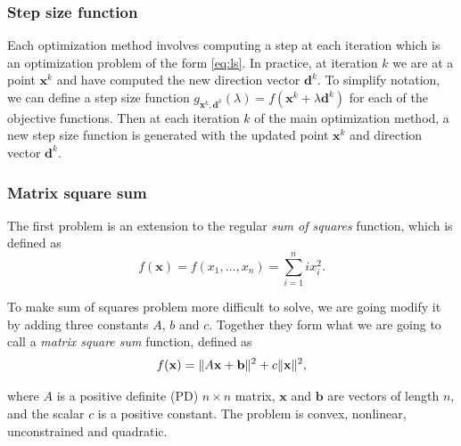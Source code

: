 \documentclass[english, 12pt, a4paper, sci, utf8, a-1b, online, table]{aaltothesis}
\newcommand{\vect}[1]{\ensuremath{\mathbf{#1}}}
\newcommand{\norm}[1]{\ensuremath\Vert #1 \Vert}
\begin{document}
\subsubsection{Step size function}

Each optimization method involves computing a step at each iteration which is an optimization problem of the form \eqref{eq:ls}. In practice, at iteration $k$ we are at a point $\vect{x}^k$ and have computed the new direction vector $\vect{d}^k$. To simplify notation, we can define a step size function $g_{\vect{x}^k, \vect{d}^k}(\lambda) = f(\vect{x}^k + \lambda \vect{d}^k)$ for each of the objective functions. Then at each iteration $k$ of the main optimization method, a new step size function is generated with the updated point $\vect{x}^k$ and direction vector $\vect{d}^k$.

\subsubsection{Matrix square sum}
\label{sect:matrix_square_sum}

The first problem is an extension to the regular \emph{sum of squares} function, which is defined as
\begin{equation}
    f(\mathbf{x})=f(x_1, ..., x_n)=\sum_{i=1}^{n}{ix_i^2}.
\end{equation}

To make sum of squares problem more difficult to solve, we are going modify it by adding three constants $A$, $b$ and $c$. Together they form what we are going to call a \emph{matrix square sum} function, defined as
\begin{equation}
    f(\vect{x}) = \norm{A \vect{x} + \vect{b}} ^ 2 + c \norm{\vect{x}} ^ 2,
\end{equation}

where $A$ is a positive definite (PD) $n \times n$ matrix, $\vect{x}$ and $\vect{b}$ are vectors of length $n$, and the scalar $c$ is a positive constant. The problem is convex, nonlinear, unconstrained and quadratic.
\end{document}
